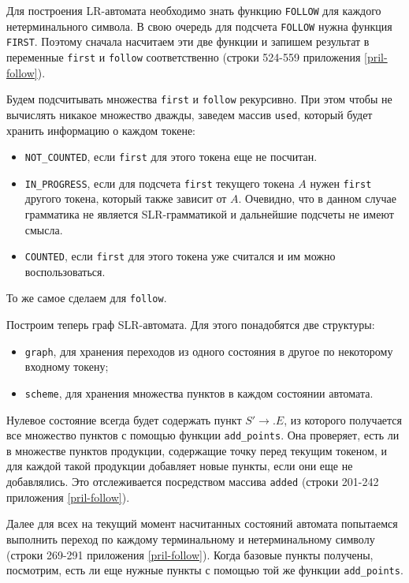 \documentclass[bachelor, och, coursework, times]{SCWorks}
\begin{document}
Для построения LR-автомата необходимо знать функцию \verb|FOLLOW| для каждого нетерминального символа. В свою очередь для подсчета \verb|FOLLOW| нужна функция \verb|FIRST|. Поэтому сначала насчитаем эти две функции и запишем результат в переменные \verb|first| и \verb|follow| соответственно (строки 524-559 приложения \ref{pril-follow}).

Будем подсчитывать множества \verb|first| и \verb|follow| рекурсивно. При этом чтобы не вычислять никакое множество дважды, заведем массив \verb|used|, который будет хранить информацию о каждом токене:
\begin{itemize}
	\item \verb|NOT_COUNTED|, если \verb|first| для этого токена еще не посчитан.
	\item \verb|IN_PROGRESS|, если для подсчета \verb|first| текущего токена $A$ нужен \verb|first| другого токена, который также зависит от $A$. Очевидно, что в данном случае грамматика не является SLR-грамматикой и дальнейшие подсчеты не имеют смысла.
	\item \verb|COUNTED|, если \verb|first| для этого токена уже считался и им можно воспользоваться.
\end{itemize}

То же самое сделаем для \verb|follow|.

Построим теперь граф SLR-автомата. Для этого понадобятся две структуры:
\begin{itemize}
	\item \verb|graph|, для хранения переходов из одного состояния в другое по некоторому входному токену;
	\item \verb|scheme|, для хранения множества пунктов в каждом состоянии автомата.
\end{itemize}

Нулевое состояние всегда будет содержать пункт $S' \to .E$, из которого получается все множество пунктов с помощью функции \verb|add_points|. Она проверяет, есть ли в множестве пунктов продукции, содержащие точку перед текущим токеном, и для каждой такой продукции добавляет новые пункты, если они еще не добавлялись. Это отслеживается посредством массива \verb|added| (строки 201-242 приложения \ref{pril-follow}).

Далее для всех на текущий момент насчитанных состояний автомата попытаемся выполнить переход по каждому терминальному и нетерминальному символу (строки 269-291 приложения \ref{pril-follow}). Когда базовые пункты получены, посмотрим, есть ли еще нужные пункты с помощью той же функции \verb|add_points|. 
\end{document}
